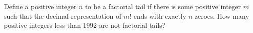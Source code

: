 Define a positive integer $ n$ to be a factorial tail if there is some positive integer $ m$ such that the decimal representation of $ m!$ ends with exactly $ n$ zeroes. How many positive integers less than $ 1992$ are not factorial tails?
